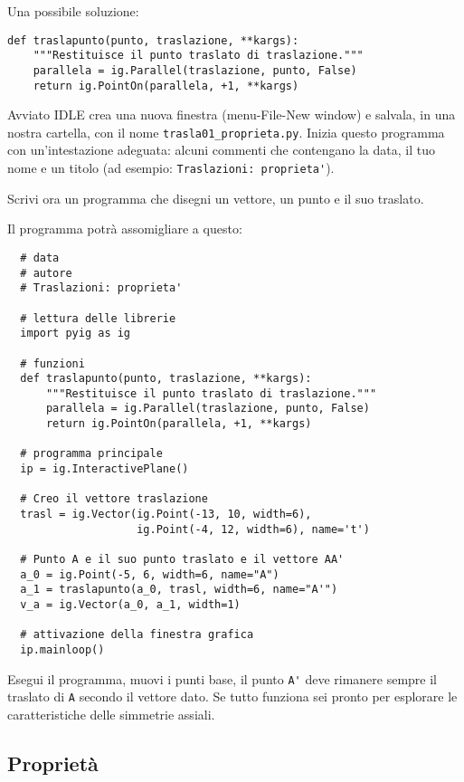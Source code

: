 Una possibile soluzione:

\begin{lstlisting}
def traslapunto(punto, traslazione, **kargs):
    """Restituisce il punto traslato di traslazione."""
    parallela = ig.Parallel(traslazione, punto, False)
    return ig.PointOn(parallela, +1, **kargs)
\end{lstlisting}

Avviato IDLE crea una nuova finestra (menu-File-New window) e 
salvala, in una nostra cartella, con il nome 
\lstinline{trasla01_proprieta.py}.
Inizia questo programma
con un'intestazione adeguata: alcuni commenti che contengano la data, il
tuo nome e un titolo (ad esempio: \lstinline{Traslazioni: proprieta'}).

Scrivi ora un programma che disegni un vettore, un punto e il
suo traslato.

Il programma potrà assomigliare a questo:

\begin{lstlisting}
  # data
  # autore
  # Traslazioni: proprieta'

  # lettura delle librerie
  import pyig as ig

  # funzioni
  def traslapunto(punto, traslazione, **kargs):
      """Restituisce il punto traslato di traslazione."""
      parallela = ig.Parallel(traslazione, punto, False)
      return ig.PointOn(parallela, +1, **kargs)

  # programma principale
  ip = ig.InteractivePlane()

  # Creo il vettore traslazione
  trasl = ig.Vector(ig.Point(-13, 10, width=6),
                    ig.Point(-4, 12, width=6), name='t')

  # Punto A e il suo punto traslato e il vettore AA'
  a_0 = ig.Point(-5, 6, width=6, name="A")
  a_1 = traslapunto(a_0, trasl, width=6, name="A'")
  v_a = ig.Vector(a_0, a_1, width=1)
  
  # attivazione della finestra grafica
  ip.mainloop()
\end{lstlisting}

Esegui il programma, muovi i punti base, il punto \lstinline{A'} deve 
rimanere
sempre il traslato di \lstinline{A} secondo il vettore dato.
Se tutto funziona sei pronto per esplorare le caratteristiche delle
simmetrie assiali.


\subsection{Proprietà}

